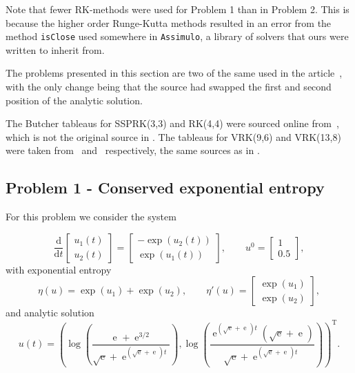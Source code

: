 \documentclass{article}
\renewcommand{\exp}[1]{\operatorname{e}^{#1}}
\newcommand{\expalt}{\operatorname{exp}}
\newcommand{\T}{\mathrm{T}}
\begin{document}
    \vspace*{5mm}
    Note that fewer RK-methods were used for Problem 1 than in Problem 2. This is because the higher order Runge-Kutta methods resulted in an error from the method \texttt{isClose} used somewhere in \texttt{Assimulo}, a library of solvers that ours were written to inherit from.

    \vspace*{5mm}
    The problems presented in this section are two of the same used in the article~\cite{Ranocha_2020}, with the only change being that the source had swapped the first and second position of the analytic solution.

    \vspace*{5mm}
    The Butcher tableaus for SSPRK(3,3) and RK(4,4) were sourced online from~\cite{wikipedia_RK}, which is not the original source in \cite{Ranocha_2020}. The tableaus for VRK(9,6) and VRK(13,8) were taken from~\cite{VRK96} and~\cite{VRK138} respectively, the same sources as in \cite{Ranocha_2020}.

\subsection{Problem 1 - Conserved exponential entropy}
    For this problem we consider the system

    \[\frac{\text{d}}{\text{d}t}
    \begin{bmatrix}
        u_1(t)\\
        u_2(t)
    \end{bmatrix} =
    \begin{bmatrix}
        -\expalt(u_2(t))\\
        \expalt(u_1(t))
    \end{bmatrix}, \qquad u^0 =
    \begin{bmatrix}
        1\\
        0.5
    \end{bmatrix},
    \]
    with exponential entropy
    \[\eta(u) = \expalt(u_1) + \expalt(u_2), \qquad \eta'(u) =
    \begin{bmatrix}
        \expalt(u_1)\\
        \expalt(u_2)
    \end{bmatrix},
    \]
    and analytic solution
    \[u(t) = \left(\log\left(\frac{\exp{} + \exp{3/2}}{\sqrt{\exp{}} + \exp{(\sqrt{\exp{}}+\exp{})t}}\right), \log\left(\frac{\exp{(\sqrt{\exp{}}+\exp{})t}(\sqrt{\exp{}}+\exp{})}{\sqrt{\exp{}} + \exp{(\sqrt{\exp{}}+\exp{})t}}\right)\right)^{\T}.\]
\end{document}
